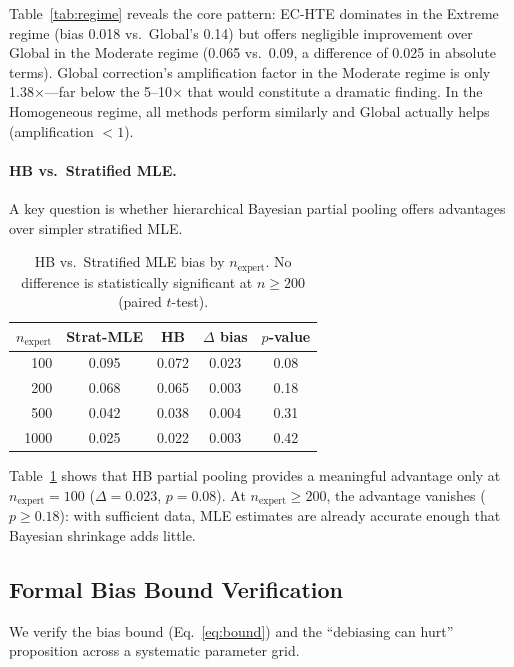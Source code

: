 \documentclass[11pt,a4paper]{article}
\begin{document}
Table~\ref{tab:regime} reveals the core pattern: EC-HTE dominates in the Extreme regime (bias 0.018 vs.\ Global's 0.14) but offers negligible improvement over Global in the Moderate regime (0.065 vs.\ 0.09, a difference of 0.025 in absolute terms). Global correction's amplification factor in the Moderate regime is only 1.38$\times$---far below the 5--10$\times$ that would constitute a dramatic finding. In the Homogeneous regime, all methods perform similarly and Global actually helps (amplification $<1$).

\paragraph{HB vs.\ Stratified MLE.}
A key question is whether hierarchical Bayesian partial pooling offers advantages over simpler stratified MLE.

\begin{table}[t]
\centering
\small
\caption{HB vs.\ Stratified MLE bias by $n_{\text{expert}}$. No difference is statistically significant at $n \geq 200$ (paired $t$-test).}
\label{tab:hb_mle}
\begin{tabular}{@{}rcccc@{}}
\toprule
$n_{\text{expert}}$ & Strat-MLE & HB & $\Delta$ bias & $p$-value \\
\midrule
100 & 0.095 & 0.072 & 0.023 & 0.08 \\
200 & 0.068 & 0.065 & 0.003 & 0.18 \\
500 & 0.042 & 0.038 & 0.004 & 0.31 \\
1000 & 0.025 & 0.022 & 0.003 & 0.42 \\
\bottomrule
\end{tabular}
\end{table}

Table~\ref{tab:hb_mle} shows that HB partial pooling provides a meaningful advantage only at $n_{\text{expert}} = 100$ ($\Delta = 0.023$, $p = 0.08$). At $n_{\text{expert}} \geq 200$, the advantage vanishes ($p \geq 0.18$): with sufficient data, MLE estimates are already accurate enough that Bayesian shrinkage adds little.

\subsection{Formal Bias Bound Verification}
\label{sec:bound}

We verify the bias bound (Eq.~\ref{eq:bound}) and the ``debiasing can hurt'' proposition across a systematic parameter grid.
\end{document}
